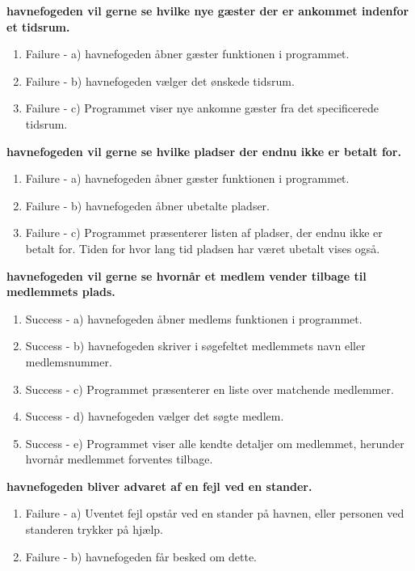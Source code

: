 {{{{	\item{\bf{havnefogeden vil gerne se hvilke nye gæster der er ankommet indenfor et tidsrum.}}
	  \begin{enumerate}
			\item Failure -  a) havnefogeden åbner gæster funktionen i programmet.
			\item Failure -  b) havnefogeden vælger det ønskede tidsrum.
			\item Failure -  c) Programmet viser nye ankomne gæster fra det specificerede tidsrum.
	   \end{enumerate}
  
	\item{\bf{havnefogeden vil gerne se hvilke pladser der endnu ikke er betalt for.}}
	  \begin{enumerate}
			\item Failure -  a) havnefogeden åbner gæster funktionen i programmet.
			\item Failure -  b) havnefogeden åbner ubetalte pladser.
			\item Failure -  c) Programmet præsenterer listen af pladser, der endnu ikke er betalt for. Tiden for hvor lang tid pladsen har været ubetalt vises også.
	   \end{enumerate}
	   
	\item{\bf{havnefogeden vil gerne se hvornår et medlem vender tilbage til medlemmets plads.}}
	  \begin{enumerate}
			\item Success -  a) havnefogeden åbner medlems funktionen i programmet.
			\item Success -  b) havnefogeden skriver i søgefeltet medlemmets navn eller medlemsnummer.
			\item Success -  c) Programmet præsenterer en liste over matchende medlemmer.
			\item Success -  d) havnefogeden vælger det søgte medlem.
			\item Success -  e) Programmet viser alle kendte detaljer om medlemmet, herunder hvornår medlemmet forventes tilbage.
	   \end{enumerate}
	   
	\item{\bf{havnefogeden bliver advaret af en fejl ved en stander.}}
	  \begin{enumerate}
			\item Failure -  a) Uventet fejl opstår ved en stander på havnen, eller personen ved standeren trykker på hjælp.
			\item Failure -  b) havnefogeden får besked om dette.
	   \end{enumerate}
	   
}}}}
